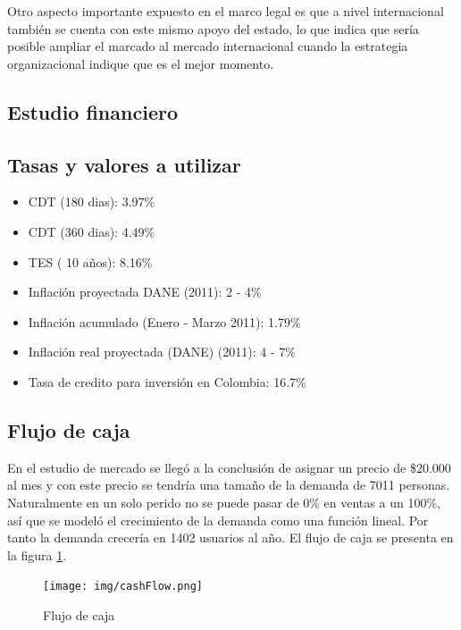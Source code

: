 \documentclass[a4paper, 12pt, oneside]{article}
\begin{document}
	Otro aspecto importante expuesto en el marco legal es que a nivel internacional también se cuenta con este mismo apoyo del estado, lo que indica que sería posible ampliar el marcado al mercado internacional cuando la estrategia organizacional indique que es el mejor momento.
	
	\clearpage
	
	\begin{center}
	\section{Estudio financiero}
	\end{center}
	
	\subsection{Tasas y valores a utilizar}
	\begin{itemize}
		\item CDT (180 dias): 3.97\%
		\item CDT (360 dias): 4.49\%
		\item TES ( 10 años): 8.16\%
		\item Inflación proyectada DANE (2011): 2 - 4\%
		\item Inflación acumulado (Enero - Marzo 2011): 1.79\%
		\item Inflación real proyectada (DANE) (2011): 4 - 7\%
		\item Tasa de credito para inversión en Colombia: 16.7\%
	\end{itemize}
	
	\subsection{Flujo de caja}
	En el estudio de mercado se llegó a la conclusión de asignar un precio de \$20.000 al mes y con este precio se tendría una tamaño de la demanda de 7011 personas. Naturalmente en un solo perido no se puede pasar de 0\% en ventas a un 100\%, así que se modeló el crecimiento de la demanda como una función lineal. Por tanto la demanda crecería en 1402 usuarios al año. El flujo de caja se presenta en la figura \ref{fig:cashFlow}.
	
	\begin{figure}
	\begin{center}
	\leavevmode
	\texttt{[image: img/cashFlow.png]}
	\end{center}
	\caption{Flujo de caja}
	\label{fig:cashFlow}
	\end{figure}
	
\end{document}
